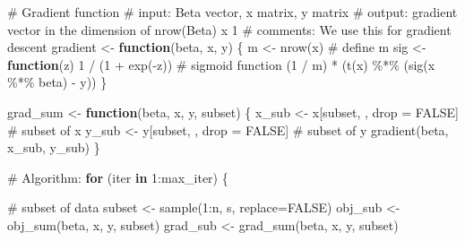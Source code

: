 \documentclass[
  letterpaper,
  DIV=11,
  numbers=noendperiod]{scrartcl}
\newenvironment{Shaded}{\begin{snugshade}}{\end{snugshade}}
\newcommand{\AttributeTok}[1]{\textcolor[rgb]{0.40,0.45,0.13}{#1}}
\newcommand{\CommentTok}[1]{\textcolor[rgb]{0.37,0.37,0.37}{#1}}
\newcommand{\ConstantTok}[1]{\textcolor[rgb]{0.56,0.35,0.01}{#1}}
\newcommand{\ControlFlowTok}[1]{\textcolor[rgb]{0.00,0.23,0.31}{\textbf{#1}}}
\newcommand{\DecValTok}[1]{\textcolor[rgb]{0.68,0.00,0.00}{#1}}
\newcommand{\FunctionTok}[1]{\textcolor[rgb]{0.28,0.35,0.67}{#1}}
\newcommand{\NormalTok}[1]{\textcolor[rgb]{0.00,0.23,0.31}{#1}}
\newcommand{\OtherTok}[1]{\textcolor[rgb]{0.00,0.23,0.31}{#1}}
\newcommand{\SpecialCharTok}[1]{\textcolor[rgb]{0.37,0.37,0.37}{#1}}
\begin{document}
\begin{Shaded}
\begin{Highlighting}[]
  \CommentTok{\# Gradient function}
  \CommentTok{\# input: Beta vector, x matrix, y matrix}
  \CommentTok{\# output: gradient vector in the dimension of nrow(Beta) x 1}
  \CommentTok{\# comments: We use this for gradient descent}
\NormalTok{  gradient }\OtherTok{\textless{}{-}} \ControlFlowTok{function}\NormalTok{(beta, x, y) \{}
\NormalTok{    m }\OtherTok{\textless{}{-}} \FunctionTok{nrow}\NormalTok{(x)                       }\CommentTok{\# define m}
\NormalTok{    sig }\OtherTok{\textless{}{-}} \ControlFlowTok{function}\NormalTok{(z) }\DecValTok{1} \SpecialCharTok{/}\NormalTok{ (}\DecValTok{1} \SpecialCharTok{+} \FunctionTok{exp}\NormalTok{(}\SpecialCharTok{{-}}\NormalTok{z))  }\CommentTok{\# sigmoid function}
\NormalTok{    (}\DecValTok{1} \SpecialCharTok{/}\NormalTok{ m) }\SpecialCharTok{*}\NormalTok{ (}\FunctionTok{t}\NormalTok{(x) }\SpecialCharTok{\%*\%}\NormalTok{ (}\FunctionTok{sig}\NormalTok{(x }\SpecialCharTok{\%*\%}\NormalTok{ beta) }\SpecialCharTok{{-}}\NormalTok{ y))}
\NormalTok{  \}}
  
\NormalTok{  grad\_sum }\OtherTok{\textless{}{-}} \ControlFlowTok{function}\NormalTok{(beta, x, y, subset) \{}
\NormalTok{    x\_sub }\OtherTok{\textless{}{-}}\NormalTok{ x[subset, , drop }\OtherTok{=} \ConstantTok{FALSE}\NormalTok{]   }\CommentTok{\# subset of x}
\NormalTok{    y\_sub }\OtherTok{\textless{}{-}}\NormalTok{ y[subset, , drop }\OtherTok{=} \ConstantTok{FALSE}\NormalTok{]   }\CommentTok{\# subset of y}
    \FunctionTok{gradient}\NormalTok{(beta, x\_sub, y\_sub)}
\NormalTok{  \}}

  \CommentTok{\# Algorithm:}
  \ControlFlowTok{for}\NormalTok{ (iter }\ControlFlowTok{in} \DecValTok{1}\SpecialCharTok{:}\NormalTok{max\_iter) \{}
    
    \CommentTok{\# subset of data}
\NormalTok{    subset }\OtherTok{\textless{}{-}} \FunctionTok{sample}\NormalTok{(}\DecValTok{1}\SpecialCharTok{:}\NormalTok{n, s, }\AttributeTok{replace=}\ConstantTok{FALSE}\NormalTok{)}
\NormalTok{    obj\_sub }\OtherTok{\textless{}{-}} \FunctionTok{obj\_sum}\NormalTok{(beta, x, y, subset)}
\NormalTok{    grad\_sub }\OtherTok{\textless{}{-}} \FunctionTok{grad\_sum}\NormalTok{(beta, x, y, subset)}
    

\end{Highlighting}
\end{Shaded}
\end{document}
